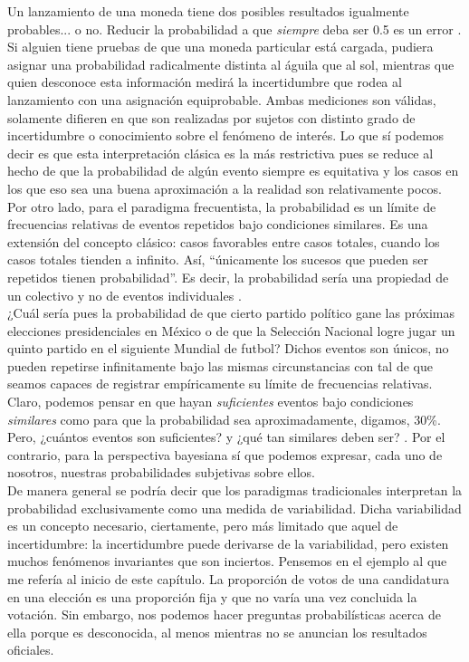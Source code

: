 Un lanzamiento de una moneda tiene dos posibles resultados igualmente probables... o no. Reducir la probabilidad a que \textit{siempre} deba ser 0.5 es un error \parencite{Nozer17}. Si alguien tiene pruebas de que una moneda particular está cargada, pudiera asignar una probabilidad radicalmente distinta al águila que al sol, mientras que quien desconoce esta información medirá la incertidumbre que rodea al lanzamiento con una asignación equiprobable. Ambas mediciones son válidas, solamente difieren en que son realizadas por sujetos con distinto grado de incertidumbre o conocimiento sobre el fenómeno de interés. Lo que sí podemos decir es que esta interpretación clásica es la más restrictiva pues se reduce al hecho de que la probabilidad de algún evento siempre es equitativa y los casos en los que eso sea una buena aproximación a la realidad son relativamente pocos.\\	 
	 
Por otro lado, para el paradigma frecuentista, la probabilidad es un límite de frecuencias relativas de eventos repetidos bajo condiciones similares. Es una extensión del concepto clásico: casos favorables entre casos totales, cuando los casos totales tienden a infinito. Así, ``únicamente los sucesos que pueden ser repetidos tienen probabilidad''\parencite{Aquino10}. Es decir, la probabilidad sería una propiedad de un colectivo  y no de eventos individuales \parencite{Nozer17}.\\ 

¿Cuál sería pues la probabilidad de que cierto partido político gane las próximas elecciones presidenciales en México o de que la Selección Nacional logre jugar un quinto partido en el siguiente Mundial de futbol? Dichos eventos son únicos, no pueden repetirse infinitamente bajo las mismas circunstancias con tal de que seamos capaces de registrar empíricamente su límite de frecuencias relativas. Claro, podemos pensar en que hayan \textit{suficientes} eventos bajo condiciones \textit{similares} como para que la probabilidad sea aproximadamente, digamos, 30\%. Pero, ¿cuántos eventos son suficientes? y ¿qué tan similares deben ser? \parencite{Nozer17}. Por el contrario, para la perspectiva bayesiana sí que podemos expresar, cada uno de nosotros, nuestras probabilidades subjetivas sobre ellos.\\ 
	
	De manera general se podría decir que los paradigmas tradicionales interpretan la probabilidad exclusivamente como una medida de variabilidad. Dicha variabilidad es un concepto necesario, ciertamente, pero más limitado que aquel de incertidumbre: la incertidumbre puede derivarse de la variabilidad, pero existen muchos fenómenos invariantes que son inciertos. Pensemos en el ejemplo al que me refería al inicio de este capítulo. La proporción de votos de una candidatura en una elección es una proporción fija y que no varía una vez concluida la votación. Sin embargo, nos podemos hacer preguntas probabilísticas acerca de ella porque es desconocida, al menos mientras no se anuncian los resultados oficiales.\\ 
	
